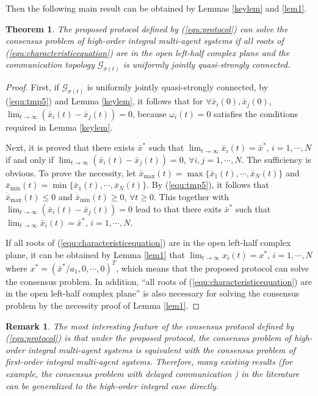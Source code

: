 \documentclass[12pt,draftcls,onecolumn]{IEEEtran}
\newtheorem{thm}{Theorem}
\newtheorem{rem}{Remark}
\begin{document}
Then the following main result can be obtained by Lemmas \ref{keylem} and \ref{lem1}.
\begin{thm}\label{thm:main}
The proposed protocol defined by (\ref{equ:protocol}) can solve the consensus problem of high-order integral multi-agent systems if all roots of (\ref{equ:characteristicequation}) are in the open left-half complex plane and the communication topology $\mathcal{G}_{\sigma(t)}$ is uniformly jointly quasi-strongly connected.
\end{thm}
\begin{proof}
First, if $\mathcal{G}_{\sigma(t)}$ is uniformly jointly quasi-strongly connected, by (\ref{equ:tmp5}) and Lemma \ref{keylem}, it follows that for $\forall \bar{x}_i(0), \bar{x}_j(0)$, $\lim_{t\to\infty}(\bar{x}_i(t)-\bar{x}_j(t)) = 0$, because $\omega_i(t) = 0$ satisfies the conditions required in Lemma \ref{keylem}.

Next, it is proved that there exists $\bar{x}^*$ such that $\lim_{t\to\infty}\bar{x}_i(t) = \bar{x}^*$, $i=1,\cdots,N$ if and only if  $\lim_{t\to\infty}(\bar{x}_i(t)-\bar{x}_j(t)) = 0$, $\forall i,j=1,\cdots,N$.
The sufficiency is obvious. To prove the necessity, let $\bar{x}_{\max}(t) = \max\{\bar{x}_1(t),\cdots,\bar{x}_N(t)\}$ and $\bar{x}_{\min}(t) = \min\{\bar{x}_1(t),\cdots,\bar{x}_N(t)\}$. By (\ref{equ:tmp5}), it follows that $\dot{\bar{x}}_{\max}(t) \leq 0$ and $\dot{\bar{x}}_{\min}(t) \geq 0$, $\forall t\geq 0$. This together with $\lim_{t\to\infty}(\bar{x}_i(t)-\bar{x}_j(t)) = 0$ lead to that there exits $\bar{x}^*$ such that $\lim_{t\to\infty}\bar{x}_i(t) = \bar{x}^*$, $i=1,\cdots,N$.

If all roots of (\ref{equ:characteristicequation}) are in the open left-half complex plane, it can be obtained by Lemma \ref{lem1} that $\lim_{t\to\infty}x_i(t) = x^*$, $i=1,\cdots,N$ where $x^* = (\bar{x}^*/a_1,0,\cdots,0)^T$, which means that the proposed protocol can solve the consensus problem. In addition, ``all roots of (\ref{equ:characteristicequation}) are in the open left-half complex plane'' is also necessary for solving the consensus problem by the necessity proof of Lemma \ref{lem1}.
\end{proof}


\begin{rem}
The most interesting feature of the consensus protocol defined by (\ref{equ:protocol}) is that under the proposed protocol, the consensus problem of high-order integral multi-agent systems is equivalent with the consensus problem of first-order integral multi-agent systems. Therefore, many existing results (for example, the consensus problem with delayed communication \cite{Saber04TAC}) in the literature can be generalized to the high-order integral case directly.
\end{rem}
\end{document}

